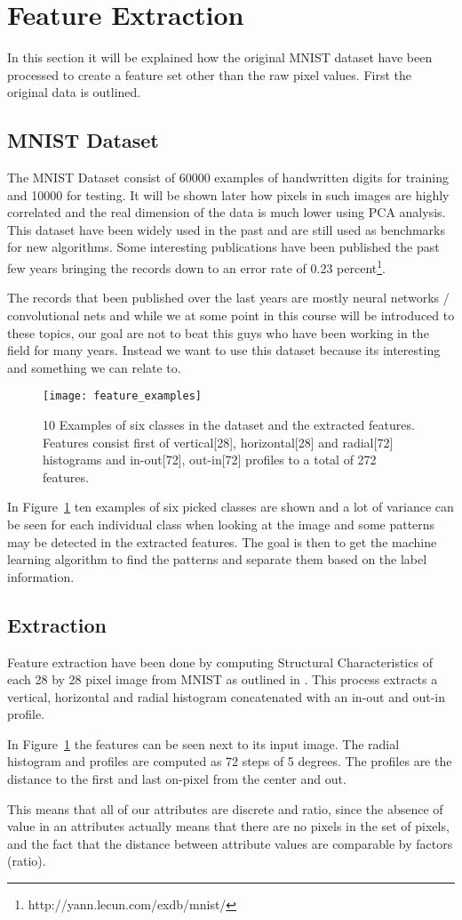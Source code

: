 \section{Feature Extraction}
In this section it will be explained how the original MNIST dataset have been processed to create a feature set other than the raw pixel values. First the original data is outlined.
\subsection{MNIST Dataset}
The MNIST Dataset consist of 60000 examples of handwritten digits for training and 10000 for testing. It will be shown later how pixels in such images are highly correlated and the real dimension of the data is much lower using PCA analysis.
This dataset have been widely used in the past and are still used as benchmarks for new algorithms. Some interesting publications have been published the past few years bringing the records down to an error rate of 0.23 percent\footnote{http://yann.lecun.com/exdb/mnist/}.

The records that been published over the last years are mostly neural networks / convolutional  nets and while we at some point in this course will be introduced to these topics, our goal are not to beat this guys who have been working in the field for many years. Instead we want to use this dataset because its interesting and something we can relate to.


\begin{figure}[H]
\centering
\texttt{[image: feature\_examples]}
\caption{10 Examples of six classes in the dataset and the extracted features. Features consist first of vertical[28], horizontal[28] and radial[72] histograms and in-out[72], out-in[72] profiles to a total of 272 features. \label{fig:image_examples}}
\end{figure}

In Figure~\ref{fig:image_examples} ten examples of six picked classes are shown and a lot of variance can be seen for each individual class when looking at the image and some patterns may be detected in the extracted features. The goal is then to get the machine learning algorithm to find the patterns and separate them based on the label information.
\subsection{Extraction}
Feature extraction have been done by computing Structural Characteristics of each 28 by 28 pixel image from MNIST as outlined in \cite{1227727}. This process extracts a vertical, horizontal and radial histogram concatenated with an in-out and out-in profile.

In Figure~\ref{fig:image_examples} the features can be seen next to its input image. The radial histogram and profiles are computed as 72 steps of 5 degrees. The profiles are the distance to the first and last on-pixel from the center and out. 

This means that all of our attributes are discrete and ratio, since the absence of value in an attributes actually means that there are no pixels in the set of pixels, and the fact that the distance between attribute values are comparable by factors (ratio).
